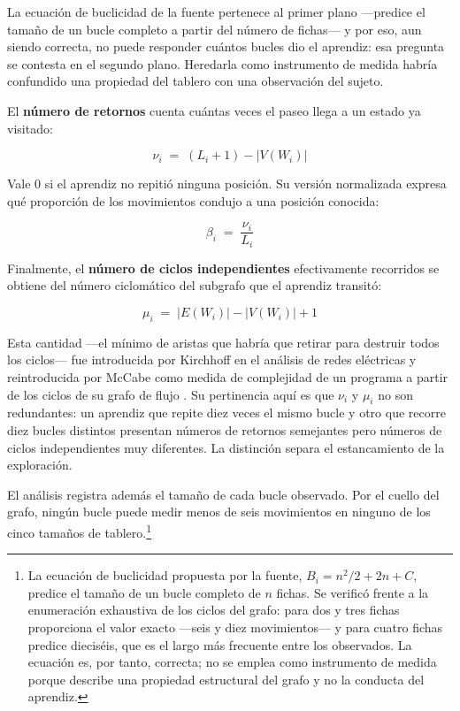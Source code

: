 \documentclass{book}
\begin{document}
La ecuación de buclicidad de la fuente pertenece al primer plano
—predice el tamaño de un bucle completo a partir del número de
fichas— y por eso, aun siendo correcta, no puede responder cuántos
bucles dio el aprendiz: esa pregunta se contesta en el segundo
plano. Heredarla como instrumento de medida habría confundido una
propiedad del tablero con una observación del sujeto.

El \textbf{número de retornos} cuenta cuántas veces el paseo llega a
un estado ya visitado:

\begin{equation}
    \nu_i \;=\; (L_i + 1) - |V(W_i)|
    \label{eq:retornos}
\end{equation}

Vale $0$ si el aprendiz no repitió ninguna posición. Su versión
normalizada expresa qué proporción de los movimientos condujo a una
posición conocida:

\begin{equation}
    \beta_i \;=\; \frac{\nu_i}{L_i}
    \label{eq:buclicidad_norm}
\end{equation}

Finalmente, el \textbf{número de ciclos independientes}
efectivamente recorridos se obtiene del número ciclomático del
subgrafo que el aprendiz transitó:

\begin{equation}
    \mu_i \;=\; |E(W_i)| - |V(W_i)| + 1
    \label{eq:ciclomatico}
\end{equation}

Esta cantidad —el mínimo de aristas que habría que retirar para
destruir todos los ciclos— fue introducida por Kirchhoff en el
análisis de redes eléctricas \cite{Kirchhoff1847} y reintroducida
por McCabe como medida de complejidad de un programa a partir de los
ciclos de su grafo de flujo \cite{McCabe1976}. Su pertinencia aquí
es que $\nu_i$ y $\mu_i$ no son redundantes: un aprendiz que repite
diez veces el mismo bucle y otro que recorre diez bucles distintos
presentan números de retornos semejantes pero números de ciclos
independientes muy diferentes. La distinción separa el
estancamiento de la exploración.

El análisis registra además el tamaño de cada bucle observado. Por
el cuello del grafo, ningún bucle puede medir menos de seis
movimientos en ninguno de los cinco tamaños de tablero.\footnote{La
ecuación de buclicidad propuesta por la fuente,
$B_i = n^{2}/2 + 2n + C$, predice el tamaño de un bucle completo de
$n$ fichas. Se verificó frente a la enumeración exhaustiva de los
ciclos del grafo: para dos y tres fichas proporciona el valor
exacto —seis y diez movimientos— y para cuatro fichas predice
dieciséis, que es el largo más frecuente entre los observados. La
ecuación es, por tanto, correcta; no se emplea como instrumento de
medida porque describe una propiedad estructural del grafo y no la
conducta del aprendiz.}
\end{document}
